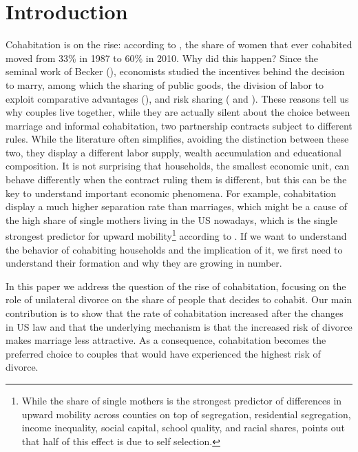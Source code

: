 \documentclass[12pt]{article}
\numberwithin{table}{section}
\begin{document}
\section{Introduction}
Cohabitation is on the rise: according to \cite{manning2013}, the share of women that ever cohabited moved from 33\% in 1987 to 60\% in 2010. Why did this happen?
Since the seminal work of Becker (\citet{becker1981}), economists studied the incentives behind the decision to marry, among which the sharing of public goods, the division of labor to exploit comparative advantages (\cite{chiappori1997}), and risk sharing (\cite{voena2015} and \cite{rigas2015}). These reasons tell us why couples live together, while they are actually silent about the choice between marriage and informal cohabitation, two partnership contracts subject to different rules. While the literature often simplifies, avoiding the distinction between these two, they display a different labor supply, wealth accumulation and educational composition. It is not surprising that households, the smallest economic unit, can behave differently when the contract ruling them is different, but this can be the key to understand important economic phenomena. For example, cohabitation display a much higher separation rate than marriages, which might be a cause of the high share of single mothers living in the US nowadays, which is the single strongest predictor for upward mobility\footnote{While the share of single mothers is the strongest predictor of differences in upward mobility across counties on top of segregation, residential segregation, income inequality, social capital, school quality, and racial shares, \cite{chetty2018} points out that half of this effect is due to self selection.} according to \cite{chetty2018}. If we want to understand the behavior of cohabiting households and the implication of it, we first need to understand their formation and why they are growing in number.

In this paper we address the question of the rise of cohabitation, focusing on the role of unilateral divorce on the share of people that decides to cohabit. Our main contribution is to show that the rate of cohabitation increased after the changes in US law and that the underlying mechanism is that the increased risk of divorce makes marriage less attractive. As a consequence, cohabitation becomes the preferred choice to couples that would have experienced the highest risk of divorce.
\end{document}
